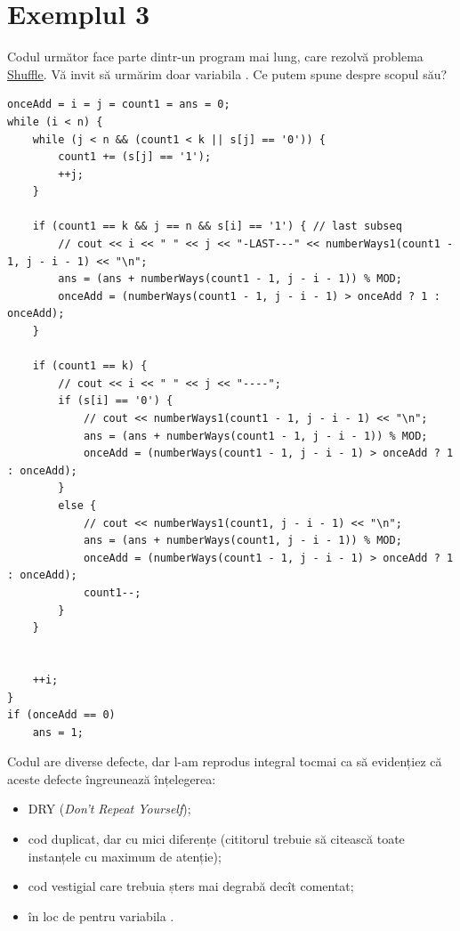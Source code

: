 \documentclass[../main.tex]{subfiles}
\begin{document}
\section{Exemplul 3}

Codul următor face parte dintr-un program mai lung, care rezolvă problema \href{https://codeforces.com/contest/1622/problem/D}{Shuffle}. Vă invit să urmărim doar variabila . Ce putem spune despre scopul său?

\begin{verbatim}
onceAdd = i = j = count1 = ans = 0;
while (i < n) {
    while (j < n && (count1 < k || s[j] == '0')) {
        count1 += (s[j] == '1');
        ++j;
    }

    if (count1 == k && j == n && s[i] == '1') { // last subseq
        // cout << i << " " << j << "-LAST---" << numberWays1(count1 - 1, j - i - 1) << "\n";
        ans = (ans + numberWays(count1 - 1, j - i - 1)) % MOD;
        onceAdd = (numberWays(count1 - 1, j - i - 1) > onceAdd ? 1 : onceAdd);
    }

    if (count1 == k) {
        // cout << i << " " << j << "----";
        if (s[i] == '0') {
            // cout << numberWays1(count1 - 1, j - i - 1) << "\n";
            ans = (ans + numberWays(count1 - 1, j - i - 1)) % MOD;
            onceAdd = (numberWays(count1 - 1, j - i - 1) > onceAdd ? 1 : onceAdd);
        }
        else {
            // cout << numberWays1(count1, j - i - 1) << "\n";
            ans = (ans + numberWays(count1, j - i - 1)) % MOD;
            onceAdd = (numberWays(count1 - 1, j - i - 1) > onceAdd ? 1 : onceAdd);
            count1--;
        }
    }


    ++i;
}
if (onceAdd == 0)
    ans = 1;
\end{verbatim}

Codul are diverse defecte, dar l-am reprodus integral tocmai ca să evidențiez că aceste defecte îngreunează înțelegerea:

\begin{itemize}
  \item DRY (\textit{Don't Repeat Yourself});

  \item cod duplicat, dar cu mici diferențe (cititorul trebuie să citească toate instanțele cu maximum de atenție);

  \item cod vestigial care trebuia șters mai degrabă decît comentat;

  \item {} în loc de  pentru variabila .
\end{itemize}
\end{document}
